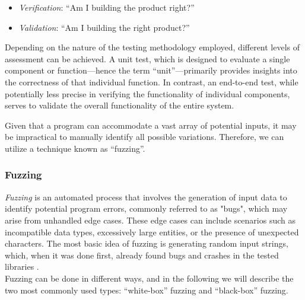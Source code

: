 \begin{itemize}[label={}]
    \item \textit{Verification}: “Am I building the product right?” 
    \item \textit{Validation}: “Am I building the right product?”
\end{itemize}
Depending on the nature of the testing methodology employed, different levels of  assessment can be achieved. A unit test, which is designed to evaluate a single component or function—hence the term “unit”—primarily provides insights into the correctness of that individual function. In contrast, an end-to-end test, while potentially less precise in verifying the functionality of individual components, serves to validate the overall functionality of the entire system. 

Given that a program can accommodate a vast array of potential inputs, it may be impractical to manually identify all possible variations. Therefore, we can utilize a technique known as “fuzzing”.

\subsubsection{Fuzzing}
\label{sec:fuzzing}
\textit{Fuzzing} is an automated process that involves the generation of input data to identify potential program errors, commonly referred to as "bugs", which may arise from unhandled edge cases. These edge cases can include scenarios such as incompatible data types, excessively large entities, or the presence of unexpected characters.
The most basic idea of fuzzing is generating random input strings, which, when it was done first, already found bugs and crashes in the tested libraries \cite{miller_empirical_1990}.\\
Fuzzing can be done in different ways, and in the following we will describe the two most commonly used types: “white-box” fuzzing and “black-box” fuzzing.


